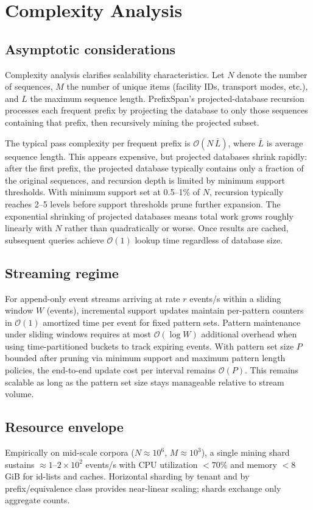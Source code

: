 \documentclass[conference]{IEEEtran}
\begin{document}
\section{Complexity Analysis}
\subsection{Asymptotic considerations}
Complexity analysis clarifies scalability characteristics. Let $N$ denote the number of sequences, $M$ the number of unique items (facility IDs, transport modes, etc.), and $L$ the maximum sequence length. PrefixSpan's projected-database recursion processes each frequent prefix by projecting the database to only those sequences containing that prefix, then recursively mining the projected subset. 

The typical pass complexity per frequent prefix is $\mathcal{O}(N\,\bar{L})$, where $\bar{L}$ is average sequence length. This appears expensive, but projected databases shrink rapidly: after the first prefix, the projected database typically contains only a fraction of the original sequences, and recursion depth is limited by minimum support thresholds. With minimum support set at 0.5--1\% of $N$, recursion typically reaches 2--5 levels before support thresholds prune further expansion. The exponential shrinking of projected databases means total work grows roughly linearly with $N$ rather than quadratically or worse. Once results are cached, subsequent queries achieve $\mathcal{O}(1)$ lookup time regardless of database size.

\subsection{Streaming regime}
For append-only event streams arriving at rate $r$ events/s within a sliding window $W$ (events), incremental support updates maintain per-pattern counters in $\mathcal{O}(1)$ amortized time per event for fixed pattern sets. Pattern maintenance under sliding windows requires at most $\mathcal{O}(\log W)$ additional overhead when using time-partitioned buckets to track expiring events. With pattern set size $P$ bounded after pruning via minimum support and maximum pattern length policies, the end-to-end update cost per interval remains $\mathcal{O}(P)$. This remains scalable as long as the pattern set size stays manageable relative to stream volume.

\subsection{Resource envelope}
Empirically on mid-scale corpora ($N\approx 10^6$, $M\approx 10^3$), a single mining shard sustains $\approx 1\text{--}2\times10^2$ events/s with CPU utilization $<70\%$ and memory $<8$\,GiB for id-lists and caches. Horizontal sharding by tenant and by prefix/equivalence class provides near-linear scaling; shards exchange only aggregate counts.
\end{document}
